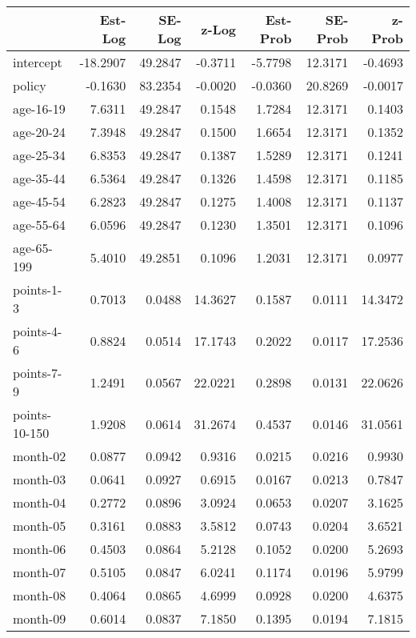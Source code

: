 \documentclass[10pt]{article}
\begin{document}
\begin{table}[ht]
\centering
\begin{tabular}{lrrrrrr}
  \hline
 & Est-Log & SE-Log & z-Log & Est-Prob & SE-Prob & z-Prob \\ 
  \hline
intercept & -18.2907 & 49.2847 & -0.3711 & -5.7798 & 12.3171 & -0.4693 \\ 
  policy & -0.1630 & 83.2354 & -0.0020 & -0.0360 & 20.8269 & -0.0017 \\ 
  age-16-19 & 7.6311 & 49.2847 & 0.1548 & 1.7284 & 12.3171 & 0.1403 \\ 
  age-20-24 & 7.3948 & 49.2847 & 0.1500 & 1.6654 & 12.3171 & 0.1352 \\ 
  age-25-34 & 6.8353 & 49.2847 & 0.1387 & 1.5289 & 12.3171 & 0.1241 \\ 
  age-35-44 & 6.5364 & 49.2847 & 0.1326 & 1.4598 & 12.3171 & 0.1185 \\ 
  age-45-54 & 6.2823 & 49.2847 & 0.1275 & 1.4008 & 12.3171 & 0.1137 \\ 
  age-55-64 & 6.0596 & 49.2847 & 0.1230 & 1.3501 & 12.3171 & 0.1096 \\ 
  age-65-199 & 5.4010 & 49.2851 & 0.1096 & 1.2031 & 12.3171 & 0.0977 \\ 
  points-1-3 & 0.7013 & 0.0488 & 14.3627 & 0.1587 & 0.0111 & 14.3472 \\ 
  points-4-6 & 0.8824 & 0.0514 & 17.1743 & 0.2022 & 0.0117 & 17.2536 \\ 
  points-7-9 & 1.2491 & 0.0567 & 22.0221 & 0.2898 & 0.0131 & 22.0626 \\ 
  points-10-150 & 1.9208 & 0.0614 & 31.2674 & 0.4537 & 0.0146 & 31.0561 \\ 
  month-02 & 0.0877 & 0.0942 & 0.9316 & 0.0215 & 0.0216 & 0.9930 \\ 
  month-03 & 0.0641 & 0.0927 & 0.6915 & 0.0167 & 0.0213 & 0.7847 \\ 
  month-04 & 0.2772 & 0.0896 & 3.0924 & 0.0653 & 0.0207 & 3.1625 \\ 
  month-05 & 0.3161 & 0.0883 & 3.5812 & 0.0743 & 0.0204 & 3.6521 \\ 
  month-06 & 0.4503 & 0.0864 & 5.2128 & 0.1052 & 0.0200 & 5.2693 \\ 
  month-07 & 0.5105 & 0.0847 & 6.0241 & 0.1174 & 0.0196 & 5.9799 \\ 
  month-08 & 0.4064 & 0.0865 & 4.6999 & 0.0928 & 0.0200 & 4.6375 \\ 
  month-09 & 0.6014 & 0.0837 & 7.1850 & 0.1395 & 0.0194 & 7.1815 \\ 

\end{tabular}
\end{table}
\end{document}
